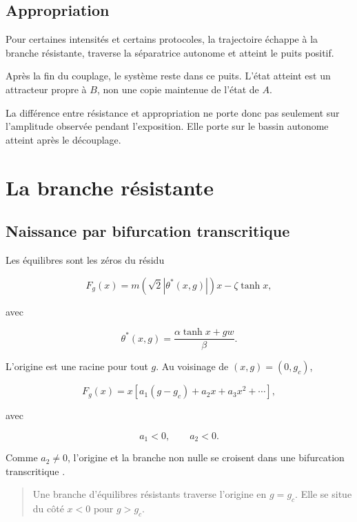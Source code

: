 \section{Appropriation}\label{t2-appropriation}

Pour certaines intensités et certains protocoles, la trajectoire échappe
à la branche résistante, traverse la séparatrice autonome et atteint le
puits positif.

Après la fin du couplage, le système reste dans ce puits. L'état atteint
est un attracteur propre à \(B\), non une copie maintenue de l'état de
\(A\).

La différence entre résistance et appropriation ne porte donc pas
seulement sur l'amplitude observée pendant l'exposition. Elle porte sur
le bassin autonome atteint après le découplage.

\chapter{La branche résistante}\label{t2-la-branche-resistante}

\section{Naissance par bifurcation transcritique}\label{t2-naissance-par-bifurcation-transcritique}

Les équilibres sont les zéros du résidu

\[
F_g(x)
=
m(\sqrt2|\theta^\ast(x,g)|)x
-
\zeta\tanh x,
\]

avec

\[
\theta^\ast(x,g)
=
\frac{\alpha\tanh x+gw}{\beta}.
\]

L'origine est une racine pour tout \(g\). Au voisinage de
\((x,g)=(0,g_c)\),

\[
F_g(x)
=
x\left[
a_1(g-g_c)
+
a_2x
+
a_3x^2
+
\cdots
\right],
\]

avec

\[
a_1<0,
\qquad
a_2<0.
\]

Comme \(a_2\neq0\), l'origine et la branche non nulle se croisent dans
une bifurcation transcritique \citep{kuznetsov2004elements}.

\begin{quote}
 Une branche d'équilibres
résistants traverse l'origine en \(g=g_c\). Elle se situe du côté
\(x<0\) pour \(g>g_c\).
\end{quote}

